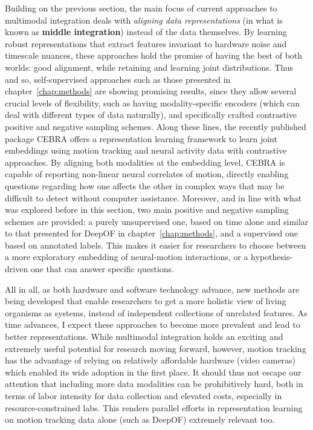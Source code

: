 Building on the previous section, the main focus of current approaches to multimodal integration deals with \textit{aligning data representations} (in what is known as \textbf{middle integration}) instead of the data themselves. By learning robust representations that extract features invariant to hardware noise and timescale nuances, these approaches hold the promise of having the best of both worlds: good alignment, while retaining and learning joint distributions. Thus and so, self-supervised approaches such as those presented in chapter~\ref{chap:methods} are showing promising results, since they allow several crucial levels of flexibility, such as having modality-specific encoders (which can deal with different types of data naturally), and specifically crafted contrastive positive and negative sampling schemes. Along these lines, the recently published package CEBRA \cite{Schneider2023LearnableAnalysis} offers a representation learning framework to learn joint embeddings using motion tracking and neural activity data with contrastive approaches. By aligning both modalities at the embedding level, CEBRA is capable of reporting non-linear neural correlates of motion, directly enabling questions regarding how one affects the other in complex ways that may be difficult to detect without computer assistance. Moreover, and in line with what was explored before in this section, two main positive and negative sampling schemes are provided: a purely unsupervised one, based on time alone and similar to that presented for DeepOF in chapter~\ref{chap:methods}, and a supervised one based on annotated labels. This makes it easier for researchers to choose between a more exploratory embedding of neural-motion interactions, or a hypothesis-driven one that can answer specific questions.

All in all, as both hardware and software technology advance, new methods are being developed that enable researchers to get a more holistic view of living organisms as systems, instead of independent collections of unrelated features. As time advances, I expect these approaches to become more prevalent and lead to better representations. While multimodal integration holds an exciting and extremely useful potential for research moving forward, however, motion tracking has the advantage of relying on relatively affordable hardware (video cameras) which enabled its wide adoption in the first place. It should thus not escape our attention that including more data modalities can be prohibitively hard, both in terms of labor intensity for data collection and elevated costs, especially in resource-constrained labs. This renders parallel efforts in representation learning on motion tracking data alone (such as DeepOF) extremely relevant too.

